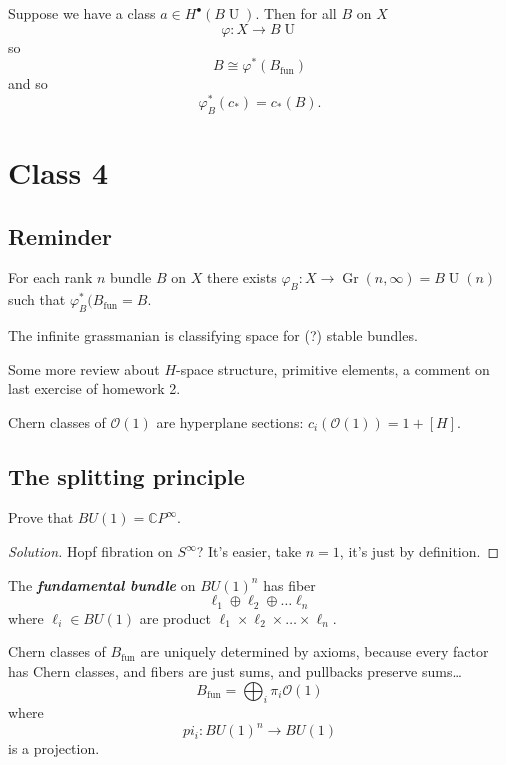 Suppose we have a class $a\in H^{\bullet}(B\operatorname{U})$. Then for all $B$ on $X$ 
\[\varphi:X\to B\operatorname{U}\]
so
\[B\cong \varphi^* (B_{\operatorname{fun}})\]
and so
\[\varphi^*_B(c_*)=c_*(B).\]





\section{Class 4}

\subsection{Reminder}

For each rank $n$ bundle $B$ on $X$ there exists $\varphi_B:X\to \operatorname{Gr}(n,\infty)=B\operatorname{U}(n)$ such that $\varphi^* _B(B_{\operatorname{f un}}=B$.

The infinite grassmanian is classifying space for (?) stable bundles.

Some more review about $H$-space structure, primitive elements, a comment on last exercise of homework 2.

Chern classes of $\mathcal{O}(1)$ are hyperplane sections: $c_i(\mathcal{O}(1))=1+[H]$.

\subsection{The splitting principle}

\begin{exercise}
	Prove that $BU(1)=\mathbb{C}P^\infty$.
\end{exercise}

\begin{proof}[Solution]\leavevmode
	Hopf fibration on $S^\infty$? It's easier, take $n=1$, it's just by  definition.
\end{proof}

\begin{defn}
	The \textit{\textbf{fundamental bundle}} on $BU(1)^n$ has fiber
	\[\ell_1\oplus \ell_2\oplus \ldots\ell_n\]
	where $\ell_i\in BU(1)$ are product $\ell_1\times \ell_2\times \ldots\times \ell_n$.
\end{defn}

\begin{remark}
	Chern classes of $B_{\operatorname{f un}}$ are uniquely determined by axioms, because every factor has Chern classes, and fibers are just sums, and pullbacks preserve sums…
	\[B_{\operatorname{f un}}=\bigoplus_{i} \pi_i \mathcal{O}(1) \]
	where
	\[pi_i:BU(1)^n\to BU(1)\]
	is a projection.
\end{remark}

